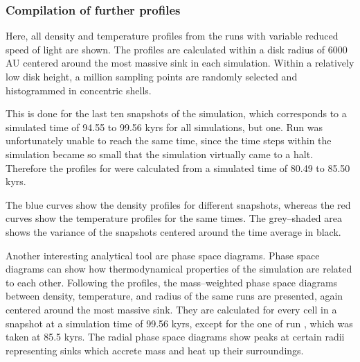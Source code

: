 \subsubsection{Compilation of further profiles}
Here, all density and temperature profiles from the runs with variable reduced speed of light are shown.
The profiles are calculated within a disk radius of 6000 AU centered around the most massive sink in each simulation.
Within a relatively low disk height, a million sampling points are randomly selected and histogrammed in concentric shells.

This is done for the last ten snapshots of the simulation, which corresponds to a simulated time of 94.55 to 99.56 kyrs for all simulations, but one.
Run  was unfortunately unable to reach the same time, since the time steps within the simulation became so small that the simulation virtually came to a halt.
Therefore the profiles for  were calculated from a simulated time of 80.49 to 85.50 kyrs.

The blue curves show the density profiles for different snapshots, whereas the red curves show the temperature profiles for the same times.
The grey--shaded area shows the variance of the snapshots centered around the time average in black.

Another interesting analytical tool are phase space diagrams.
Phase space diagrams can show how thermodynamical properties of the simulation are related to each other.
Following the profiles, the mass--weighted phase space diagrams between density, temperature, and radius of the same runs are presented, again centered around the most massive sink.
They are calculated for every cell in a snapshot at a simulation time of 99.56 kyrs, except for the one of run , which was taken at 85.5 kyrs.
The radial phase space diagrams show peaks at certain radii representing sinks which accrete mass and heat up their surroundings.



